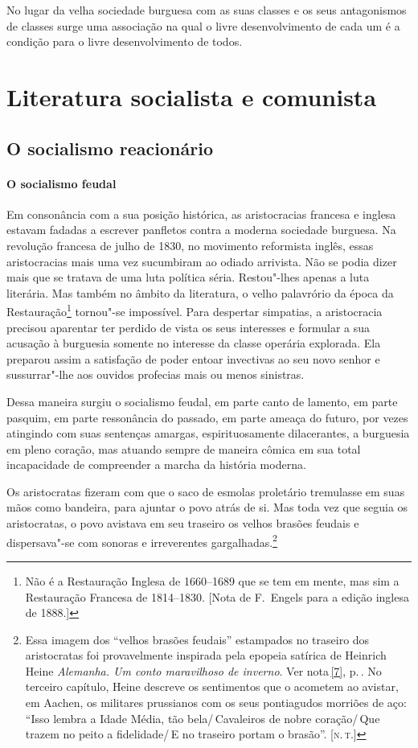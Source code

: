 No lugar da velha sociedade burguesa com as suas classes e os seus
antagonismos de classes surge uma associação na qual o livre
desenvolvimento de cada um é a condição para o livre desenvolvimento de
todos.

\section{Literatura socialista e comunista}

\subsection{O socialismo reacionário}

\paragraph{O socialismo feudal}
Em consonância com a sua posição histórica, as aristocracias
francesa e inglesa estavam fadadas a escrever panfletos contra a
moderna sociedade burguesa. Na revolução francesa de julho de 1830, no
movimento reformista inglês, essas aristocracias mais uma vez				
sucumbiram ao odiado arrivista. Não se podia dizer mais que se tratava
de uma luta política séria. Restou"-lhes apenas a luta literária. Mas
também no âmbito da literatura, o velho palavrório da época da
Restauração\footnote{ Não é a Restauração Inglesa de 1660--1689 que se tem em mente, mas sim a
Restauração Francesa de 1814--1830. [Nota de F.~Engels para a edição
inglesa de 1888.]}
tornou"-se impossível. Para despertar simpatias, a
aristocracia precisou aparentar ter perdido de vista os seus interesses
e formular a sua acusação à burguesia somente no interesse da
classe operária explorada. Ela preparou assim a satisfação de
poder entoar invectivas ao seu novo senhor e sussurrar"-lhe aos
ouvidos profecias mais ou menos sinistras.

Dessa maneira surgiu o socialismo feudal, em parte canto de lamento, em
parte pasquim, em parte ressonância do passado, em parte ameaça do
futuro, por vezes atingindo com suas sentenças amargas,
espirituosamente dilacerantes, a burguesia em pleno coração, mas
atuando sempre de maneira cômica em sua total incapacidade de
compreender a marcha da história moderna.

Os aristocratas fizeram com que o saco de esmolas proletário
tremulasse em suas mãos como bandeira, para ajuntar o povo atrás de si.
Mas toda vez que seguia os aristocratas, o povo avistava em seu
traseiro os velhos brasões feudais e dispersava"-se com sonoras e
irreverentes
gargalhadas.\footnote{ Essa imagem dos ``velhos brasões feudais''
estampados no traseiro dos aristocratas foi provavelmente inspirada
pela epopeia satírica de Heinrich Heine \textit{Alemanha. Um
conto maravilhoso de inverno}. Ver nota\,\ref{7}, p.\,\pageref{7}. No terceiro capítulo, Heine
descreve os sentimentos que o acometem ao avistar, em Aachen, os
militares prussianos com os seus pontiagudos morriões de aço: ``Isso
lembra a Idade Média, tão bela/\,Cavaleiros de nobre coração/\,Que
trazem no peito a fidelidade/\,E no traseiro portam o brasão''. [\textsc{n.\,t.}]}

